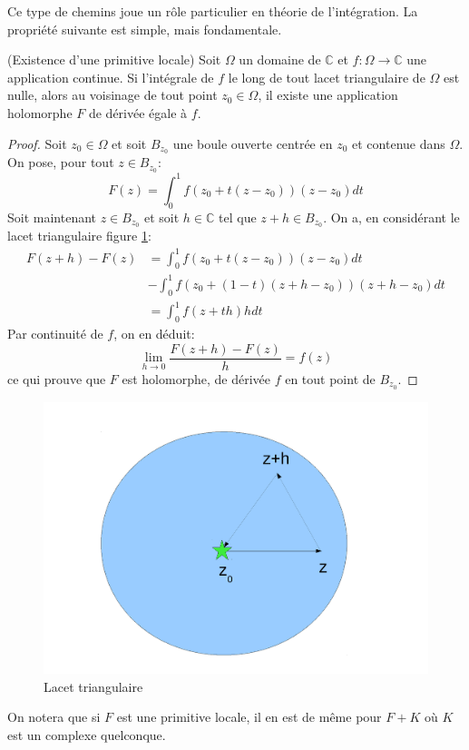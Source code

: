Ce type de chemins joue un rôle particulier en théorie de l'intégration. La
propriété suivante est simple, mais fondamentale.

\begin{fprop}(Existence d'une primitive locale)
Soit $\Omega$ un domaine de $\mathbb{C}$ et $f \colon \Omega \to \mathbb{C}$ une
application continue. Si l'intégrale de $f$ le long de tout lacet triangulaire
de $\Omega$ est nulle, alors au voisinage de tout point $z_0 \in \Omega$, il
existe une application holomorphe $F$ de dérivée égale à $f$.
\end{fprop}

\begin{proof}
Soit $z_0 \in \Omega$ et soit $B_{z_0}$ une boule ouverte centrée en $z_0$ et
contenue dans $\Omega$. On pose, pour tout $z \in
B_{z_0}$:
\[
F(z) = \int_0^1 f(z_0 + t(z-z_0))(z-z_0) dt
\]
Soit maintenant $z \in B_{z_0}$ et soit $h \in \mathbb{C}$ tel que
$z+h \in B_{z_0}$. On a, en considérant le lacet triangulaire figure
\ref{fig:morera}:
\begin{align*}
F(z+h)-F(z) &= \int_0^1 f(z_0 + t(z-z_0))(z-z_0) dt \\
& - \int_0^1 f(z_0 +
(1-t)(z + h -z_0))(z + h-z_0) dt \\
&= \int_0^1 f(z+th)h dt 
\end{align*}
Par continuité de $f$, on en déduit:
\[
\lim_{h \to 0} \frac{F(z+h)-F(z)}{h} = f(z)
\]
ce qui prouve que $F$ est holomorphe, de dérivée $f$ en tout point de
$B_{z_0}$. 
\end{proof}
 \begin{figure}[ht]
\includegraphics[scale=0.3]{images/morera.pdf}
\caption{Lacet triangulaire}\label{fig:morera}
\end{figure}
On notera que si $F$ est une primitive locale, il en est de même pour $F+K$ où
$K$ est un complexe quelconque.

